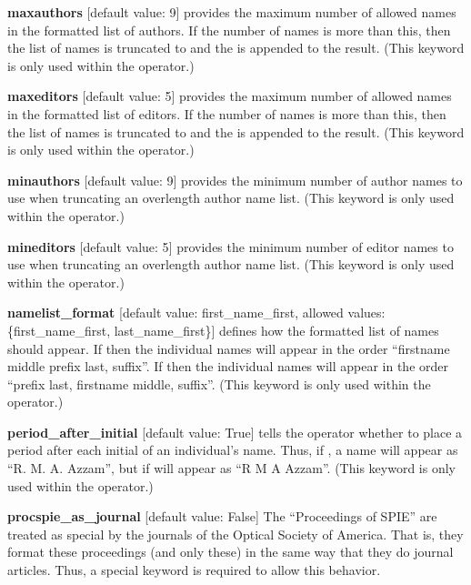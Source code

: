 \documentclass[letterpaper,10pt,english]{sphinxmanual}
\begin{document}
\textbf{maxauthors} {[}default value: 9{]} provides the maximum number of allowed names in the formatted list of authors. If the number of names is more than this, then the list of names is truncated to  and the  is appended to the result. (This keyword is only used within the  operator.)

\textbf{maxeditors} {[}default value: 5{]} provides the maximum number of allowed names in the formatted list of editors. If the number of names is more than this, then the list of names is truncated to  and the  is appended to the result. (This keyword is only used within the  operator.)

\textbf{minauthors} {[}default value: 9{]} provides the minimum number of author names to use when truncating an overlength author name list. (This keyword is only used within the  operator.)

\textbf{mineditors} {[}default value: 5{]} provides the minimum number of editor names to use when truncating an overlength author name list. (This keyword is only used within the  operator.)

\textbf{namelist\_format} {[}default value: first\_name\_first, allowed values: \{first\_name\_first, last\_name\_first\}{]} defines how the formatted list of names should appear. If  then the individual names will appear in the order ``firstname middle prefix last, suffix''. If  then the individual names will appear in the order ``prefix last, firstname middle, suffix''. (This keyword is only used within the  operator.)

\textbf{period\_after\_initial} {[}default value: True{]} tells the  operator whether to place a period after each initial of an individual's name. Thus, if , a name will appear as ``R. M. A. Azzam'', but if  will appear as ``R M A Azzam''. (This keyword is only used within the  operator.)

\textbf{procspie\_as\_journal} {[}default value: False{]} The ``Proceedings of SPIE'' are treated as special by the journals of the Optical Society of America. That is, they format these proceedings (and only these) in the same way that they do journal articles. Thus, a special keyword is required to allow this behavior.
\end{document}
